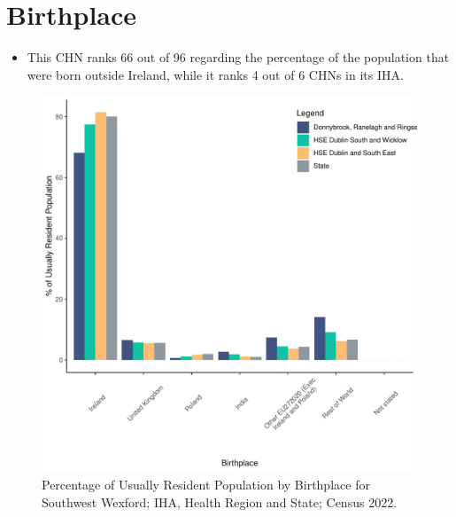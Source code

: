 \documentclass{article}
\begin{document}
\section{Birthplace}\label{sect:Birth}
\begin{itemize}
\item This CHN ranks  66 out of 96 regarding the percentage of the population that were born outside Ireland, while it ranks  4 out of 6 CHNs in its IHA.
\end{itemize}
\begin{figure}[H]
	\centering
	\includegraphics[width = 130mm]{../figures/BirthED.pdf}
	\caption{Percentage of Usually Resident Population by Birthplace for Southwest Wexford; IHA, Health Region and State; Census 2022.}
	\label{fig:vbnv}
	\end{figure}
	
\end{document}
